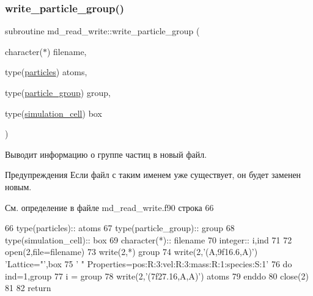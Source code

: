 \subsubsection{\texorpdfstring{write\+\_\+particle\+\_\+group()}{write\_particle\_group()}}
{\footnotesize\ttfamily subroutine md\+\_\+read\+\_\+write\+::write\+\_\+particle\+\_\+group (\begin{DoxyParamCaption}\item[{character($\ast$)}]{filename,  }\item[{type(\mbox{\hyperlink{structmd__general_1_1particles}{particles}})}]{atoms,  }\item[{type(\mbox{\hyperlink{structmd__general_1_1particle__group}{particle\+\_\+group}})}]{group,  }\item[{type(\mbox{\hyperlink{structmd__general_1_1simulation__cell}{simulation\+\_\+cell}})}]{box }\end{DoxyParamCaption})}



Выводит информацию о группе частиц в новый файл. 

\begin{DoxyWarning}{Предупреждения}
Если файл с таким именем уже существует, он будет заменен новым. 
\end{DoxyWarning}


См. определение в файле md\+\_\+read\+\_\+write.\+f90 строка 66


\begin{DoxyCode}
66     \textcolor{keywordtype}{type}(particles)::   atoms
67     \textcolor{keywordtype}{type}(particle\_group)::  group
68     \textcolor{keywordtype}{type}(simulation\_cell):: box
69     \textcolor{keywordtype}{character(*)}::  filename
70     \textcolor{keywordtype}{integer}::       i,ind
71 
72     \textcolor{keyword}{open}(2,file=filename)
73     \textcolor{keyword}{write}(2,*) group%
74     \textcolor{keyword}{write}(2,\textcolor{stringliteral}{'(A,9f16.6,A)'}) \textcolor{stringliteral}{'Lattice="'},box%
75             \textcolor{stringliteral}{' " Properties=pos:R:3:vel:R:3:mass:R:1:species:S:1'}
76     \textcolor{keywordflow}{do} ind=1,group%
77         i = group%
78         \textcolor{keyword}{write}(2,\textcolor{stringliteral}{'(7f27.16,A,A)'}) atoms%
79 \textcolor{keywordflow}{    enddo}
80     \textcolor{keyword}{close}(2)
81 
82     \textcolor{keywordflow}{return}
\end{DoxyCode}
\mbox{\label{namespacemd__read__write_a24453b47bb1935e66563cd522e09e3af}} 
